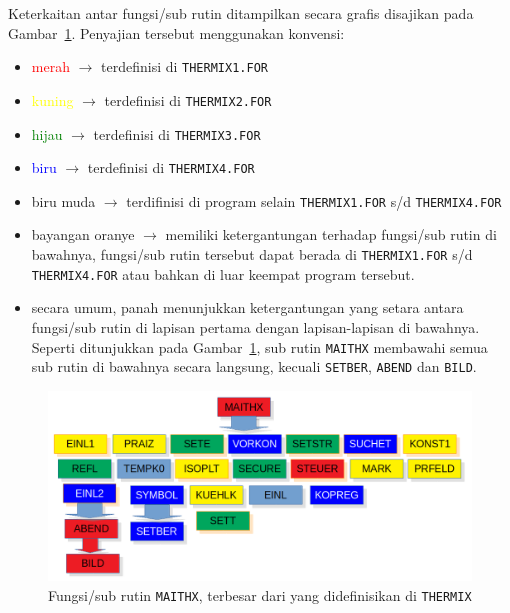 \documentclass[a4paper,11pt]{report}
\renewcommand{\figurename}{Gambar}
\begin{document}
Keterkaitan antar fungsi/sub rutin ditampilkan secara grafis disajikan pada \figurename~\ref{fig:maithx}. Penyajian tersebut menggunakan konvensi:
\begin{itemize}
  \item \textcolor{red}{merah} $\rightarrow$ terdefinisi di \texttt{THERMIX1.FOR}
  \item \textcolor{yellow}{kuning} $\rightarrow$ terdefinisi di \texttt{THERMIX2.FOR}
  \item \textcolor{green}{hijau} $\rightarrow$ terdefinisi di \texttt{THERMIX3.FOR}
  \item \textcolor{blue}{biru} $\rightarrow$ terdefinisi di \texttt{THERMIX4.FOR}
  \item \textcolor{biruMuda}{biru muda} $\rightarrow$ terdifinisi di program selain \texttt{THERMIX1.FOR} s/d \texttt{THERMIX4.FOR}
  \item bayangan \textcolor{amber}{oranye} $\rightarrow$ memiliki ketergantungan terhadap fungsi/sub rutin di bawahnya, fungsi/sub rutin tersebut dapat berada di \texttt{THERMIX1.FOR} s/d \texttt{THERMIX4.FOR} atau bahkan di luar keempat program tersebut.
  \item secara umum, panah menunjukkan ketergantungan yang setara antara fungsi/sub rutin di lapisan pertama dengan lapisan-lapisan di bawahnya. Seperti ditunjukkan pada \figurename~\ref{fig:maithx}, sub rutin \texttt{MAITHX} membawahi semua sub rutin di bawahnya secara langsung, kecuali \texttt{SETBER}, \texttt{ABEND} dan \texttt{BILD}.
\end{itemize}

\begin{figure}[h!]
  \begin{center}
    \includegraphics[scale=.5]{../maithx.png}
    \caption{Fungsi/sub rutin \texttt{MAITHX}, terbesar dari yang didefinisikan di \texttt{THERMIX}}
    \label{fig:maithx}
  \end{center}
\end{figure}
\end{document}
